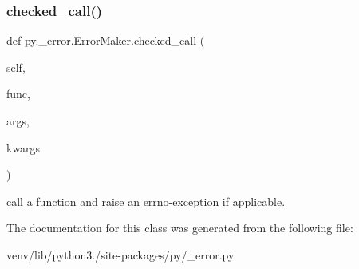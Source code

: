 \subsubsection{\texorpdfstring{checked\+\_\+call()}{checked\_call()}}
{\footnotesize\ttfamily def py.\+\_\+error.\+Error\+Maker.\+checked\+\_\+call (\begin{DoxyParamCaption}\item[{}]{self,  }\item[{}]{func,  }\item[{}]{args,  }\item[{}]{kwargs }\end{DoxyParamCaption})}

\begin{DoxyVerb}call a function and raise an errno-exception if applicable. \end{DoxyVerb}
 

The documentation for this class was generated from the following file\+:\begin{DoxyCompactItemize}
\item 
venv/lib/python3./site-\/packages/py/\+\_\+error.\+py\end{DoxyCompactItemize}
